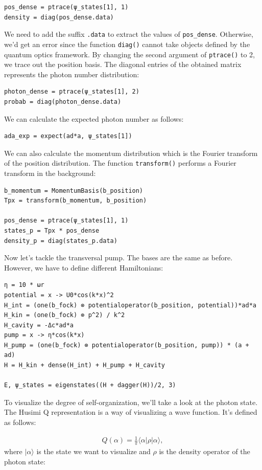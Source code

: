 \begin{lstlisting}
pos_dense = ptrace(ψ_states[1], 1)
density = diag(pos_dense.data)
\end{lstlisting} We need to add the suffix \texttt{.data} to extract the values of \texttt{pos\_dense}. Otherwise, we'd get an error since the function \texttt{diag()} cannot take objects defined by the quantum optics framework. By changing the second argument of \texttt{ptrace()} to 2, we trace out the position basis. The diagonal entries of the obtained matrix represents the photon number distribution:

\begin{lstlisting}
photon_dense = ptrace(ψ_states[1], 2)
probab = diag(photon_dense.data)
\end{lstlisting}We can calculate the expected photon number as follows:

\begin{lstlisting}
ada_exp = expect(ad*a, ψ_states[1])
\end{lstlisting}We can also calculate the momentum distribution which is the Fourier transform of the position distribution. The function \texttt{transform()} performs a Fourier transform in the background:
\vspace{0.5em}
\begin{lstlisting}
b_momentum = MomentumBasis(b_position)
Tpx = transform(b_momentum, b_position)

pos_dense = ptrace(ψ_states[1], 1)
states_p = Tpx * pos_dense
density_p = diag(states_p.data)
\end{lstlisting}Now let's tackle the transversal pump. The bases are the same as before. However, we have to define different Hamiltonians:

\begin{lstlisting}
η = 10 * ωr
potential = x -> U0*cos(k*x)^2
H_int = (one(b_fock) ⊗ potentialoperator(b_position, potential))*ad*a
H_kin = (one(b_fock) ⊗ p^2) / k^2
H_cavity = -Δc*ad*a
pump = x -> η*cos(k*x)
H_pump = (one(b_fock) ⊗ potentialoperator(b_position, pump)) * (a + ad)
H = H_kin + dense(H_int) + H_pump + H_cavity

E, ψ_states = eigenstates((H + dagger(H))/2, 3)
\end{lstlisting}To visualize the degree of self-organization, we'll take a look at the photon state. The Husimi Q representation is a way of visualizing a wave function. It's defined as follows:

\begin{align}
Q(\alpha) = \frac{1}{\pi} \langle \alpha | \rho | \alpha \rangle,
\end{align}where $| \alpha \rangle$ is the state we want to visualize and $\rho$ is the density operator of the photon state:

